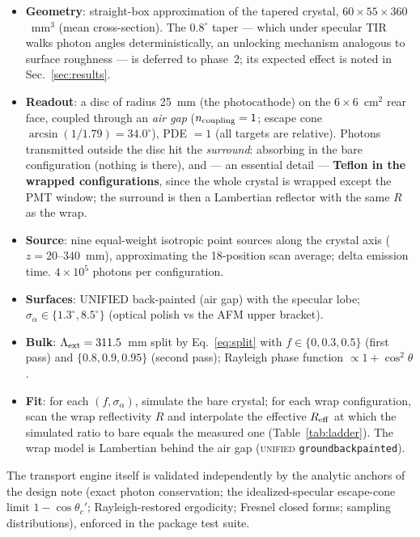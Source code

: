 \documentclass[11pt,a4paper]{article}
\newcommand{\lext}{\Lambda_{\rm ext}}
\newcommand{\sa}{\sigma_\alpha}
\begin{document}
\begin{itemize}
  \item \textbf{Geometry}: straight-box approximation of the tapered crystal,
    $60\times55\times360$~mm$^3$ (mean cross-section). The $0.8^\circ$ taper --- which
    under specular TIR walks photon angles deterministically, an unlocking mechanism
    analogous to surface roughness --- is deferred to phase~2; its expected effect is
    noted in Sec.~\ref{sec:results}.
  \item \textbf{Readout}: a disc of radius 25~mm (the photocathode) on the
    $6\times6$~cm$^2$ rear face, coupled through an \emph{air gap}
    ($n_{\rm coupling}=1$; escape cone $\arcsin(1/1.79) = 34.0^\circ$), PDE $= 1$
    (all targets are relative). Photons transmitted outside the disc hit the
    \emph{surround}: absorbing in the bare configuration (nothing is there), and ---
    an essential detail --- \textbf{Teflon in the wrapped configurations}, since the
    whole crystal is wrapped except the PMT window; the surround is then a Lambertian
    reflector with the same $R$ as the wrap.
  \item \textbf{Source}: nine equal-weight isotropic point sources along the crystal
    axis ($z = 20$--$340$~mm), approximating the 18-position scan average; delta
    emission time. $4\times10^5$ photons per configuration.
  \item \textbf{Surfaces}: UNIFIED back-painted (air gap) with the specular lobe;
    $\sa \in \{1.3^\circ, 8.5^\circ\}$ (optical polish vs the AFM upper bracket).
  \item \textbf{Bulk}: $\lext = 311.5$~mm split by Eq.~\ref{eq:split} with
    $f \in \{0, 0.3, 0.5\}$ (first pass) and $\{0.8, 0.9, 0.95\}$ (second pass);
    Rayleigh phase function $\propto 1+\cos^2\theta$.
  \item \textbf{Fit}: for each $(f, \sa)$, simulate the bare crystal; for each wrap
    configuration, scan the wrap reflectivity $R$ and interpolate the effective
    $R_{\rm eff}$ at which the simulated ratio to bare equals the measured one
    (Table~\ref{tab:ladder}). The wrap model is Lambertian behind the air gap
    (\textsc{unified} \texttt{groundbackpainted}).
\end{itemize}

The transport engine itself is validated independently by the analytic anchors of the
design note (exact photon conservation; the idealized-specular escape-cone limit
$1-\cos\theta_c'$; Rayleigh-restored ergodicity; Fresnel closed forms; sampling
distributions), enforced in the package test suite.
\end{document}
